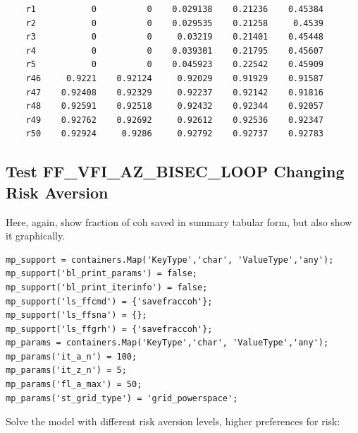 \documentclass[
]{book}
\begin{document}
\begin{verbatim}
    r1           0          0    0.029138    0.21236    0.45384
    r2           0          0    0.029535    0.21258     0.4539
    r3           0          0     0.03219    0.21401    0.45448
    r4           0          0    0.039301    0.21795    0.45607
    r5           0          0    0.045923    0.22542    0.45909
    r46     0.9221    0.92124     0.92029    0.91929    0.91587
    r47    0.92408    0.92329     0.92237    0.92142    0.91816
    r48    0.92591    0.92518     0.92432    0.92344    0.92057
    r49    0.92762    0.92692     0.92612    0.92536    0.92347
    r50    0.92924     0.9286     0.92792    0.92737    0.92783
\end{verbatim}

\hypertarget{test-ff_vfi_az_bisec_loop-changing-risk-aversion}{%
\subsection{Test FF\_VFI\_AZ\_BISEC\_LOOP Changing Risk Aversion}\label{test-ff_vfi_az_bisec_loop-changing-risk-aversion}}

Here, again, show fraction of coh saved in summary tabular form, but
also show it graphically.

\begin{verbatim}
mp_support = containers.Map('KeyType','char', 'ValueType','any');
mp_support('bl_print_params') = false;
mp_support('bl_print_iterinfo') = false;
mp_support('ls_ffcmd') = {'savefraccoh'};
mp_support('ls_ffsna') = {};
mp_support('ls_ffgrh') = {'savefraccoh'};
mp_params = containers.Map('KeyType','char', 'ValueType','any');
mp_params('it_a_n') = 100;
mp_params('it_z_n') = 5;
mp_params('fl_a_max') = 50;
mp_params('st_grid_type') = 'grid_powerspace';
\end{verbatim}

Solve the model with different risk aversion levels, higher preferences
for risk:
\end{document}
